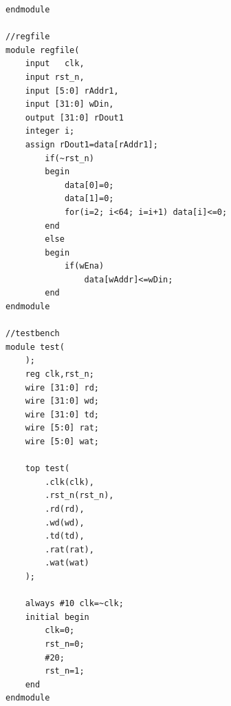 \documentclass[UTF8]{ctexart}
\begin{document}
\begin{verbatim}
endmodule

//regfile
module regfile(
	input	clk,
	input rst_n,
	input [5:0] rAddr1,
	input [31:0] wDin,
	output [31:0] rDout1
	integer i;
	assign rDout1=data[rAddr1];
		if(~rst_n)
		begin
			data[0]=0;
			data[1]=0;
			for(i=2; i<64; i=i+1) data[i]<=0;
		end
		else
		begin
			if(wEna)
				data[wAddr]<=wDin;
		end
endmodule

//testbench
module test(
    );
	reg clk,rst_n;
	wire [31:0] rd;
	wire [31:0] wd;
	wire [31:0] td;
	wire [5:0] rat;
	wire [5:0] wat;
 
	top test(
		.clk(clk),
		.rst_n(rst_n),
		.rd(rd),
		.wd(wd),
		.td(td),
		.rat(rat),
		.wat(wat)
	);
	  
	always #10 clk=~clk;
	initial begin
		clk=0;
		rst_n=0;
		#20;
		rst_n=1;
	end
endmodule
\end{verbatim}
\end{document}
